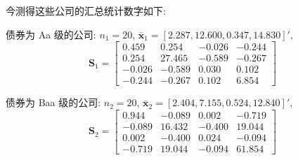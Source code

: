 今测得这些公司的汇总统计数字如下:

债券为 Aa 级的公司: $n_{1}=20$, $\bar{\mathbf{x}}_{1}=[2.287, 12.600, 0.347, 14.830]'$,
\[
\mathbf{S}_{1}=\begin{bmatrix}
0.459 & 0.254 & -0.026 & -0.244\\
0.254 & 27.465 & -0.589 & -0.267\\
-0.026 & -0.589 & 0.030 & 0.102\\
-0.244 & -0.267 & 0.102 & 6.854
\end{bmatrix}
\]

债券为 Baa 级的公司: $n_{2}=20$, $\bar{\mathbf{x}}_{2}=[2.404, 7.155, 0.524, 12.840]'$,
\[
\mathbf{S}_{2}=\begin{bmatrix}
0.944 & -0.089 & 0.002 & -0.719\\
-0.089 & 16.432 & -0.400 & 19.044\\
0.002 & -0.400 & 0.024 & -0.094\\
-0.719 & 19.044 & -0.094 & 61.854
\end{bmatrix}
\]
